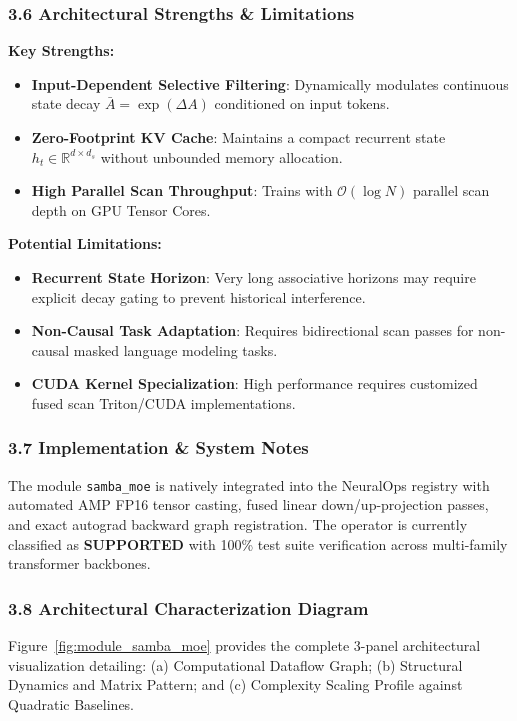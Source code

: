 \subsubsection*{3.6 Architectural Strengths \& Limitations}
\textbf{Key Strengths:}
\begin{itemize}
    \item \textbf{Input-Dependent Selective Filtering}: Dynamically modulates continuous state decay $\bar{A} = \exp(\Delta A)$ conditioned on input tokens.
    \item \textbf{Zero-Footprint KV Cache}: Maintains a compact recurrent state $h_t \in \mathbb{R}^{d \times d_s}$ without unbounded memory allocation.
    \item \textbf{High Parallel Scan Throughput}: Trains with $\mathcal{O}(\log N)$ parallel scan depth on GPU Tensor Cores.
\end{itemize}

\textbf{Potential Limitations:}
\begin{itemize}
    \item \textbf{Recurrent State Horizon}: Very long associative horizons may require explicit decay gating to prevent historical interference.
    \item \textbf{Non-Causal Task Adaptation}: Requires bidirectional scan passes for non-causal masked language modeling tasks.
    \item \textbf{CUDA Kernel Specialization}: High performance requires customized fused scan Triton/CUDA implementations.
\end{itemize}

\subsubsection*{3.7 Implementation \& System Notes}
The module \texttt{samba\_moe} is natively integrated into the NeuralOps registry with automated AMP FP16 tensor casting, fused linear down/up-projection passes, and exact autograd backward graph registration. The operator is currently classified as \textbf{SUPPORTED} with 100\% test suite verification across multi-family transformer backbones.

\subsubsection*{3.8 Architectural Characterization Diagram}
Figure~\ref{fig:module_samba_moe} provides the complete 3-panel architectural visualization detailing: (a) Computational Dataflow Graph; (b) Structural Dynamics and Matrix Pattern; and (c) Complexity Scaling Profile against Quadratic Baselines.

